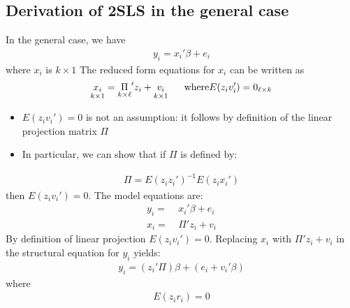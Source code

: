 \documentclass[a4paper,twoside,11pt]{article}
\begin{document}
\subsection{Derivation of 2SLS in the general case}
In the general case, we have
\begin{equation*}
\begin{aligned}
y_i = x_i' \beta + e_i
\end{aligned} 
\end{equation*}
where $x_i$ is $k \times 1$
\newline
\newline
The reduced form equations for $x_i$ can be written as 
\begin{equation*}
\begin{aligned}
\underset{k \times 1}{x_i} = \underset{k \times \ell}{\Pi}' z_i + \underset{k \times 1}{v_i} \ \ \ \ \ \textmd{where} E(z_i v_i') = 0_{\ell \times k}
\end{aligned} 
\end{equation*}
\begin{itemize}
    \item $E(z_iv_i') =0$ is not an assumption: it follows by definition of the linear projection matrix $\Pi$
    \item In particular, we can show that if $\Pi$ is defined by:
\end{itemize}
\begin{equation*}
\begin{aligned}
\Pi = E(z_i z_i')^{-1} E(z_i x_i')
\end{aligned} 
\end{equation*}
then $E(z_i v_i') =0$. The model equations are: 
\begin{equation*}
\begin{aligned}
y_i =& \ x_i' \beta + e_i \\
x_i =& \ \Pi' z_i + v_i
\end{aligned} 
\end{equation*}
By definition of linear projection $E(z_i v_i')=0$. Replacing $x_i$ with $\Pi'z_i + v_i$ in the structural equation for $y_i$ yields:
\begin{equation*}
\begin{aligned}
y_i = (z_i' \Pi)\beta + (e_i + v_i' \beta)
\end{aligned} 
\end{equation*}
where
\begin{equation*}
\begin{aligned}
E(z_i r_i) =0
\end{aligned} 
\end{equation*}
\end{document}
